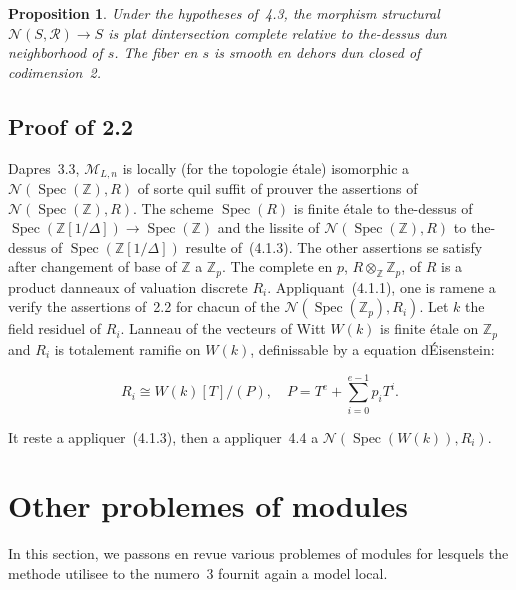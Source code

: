 \documentclass[11pt,a4paper]{article}
\theoremstyle{plain}
\newtheorem{proposition}[theorem]{Proposition}
\theoremstyle{definition}
\DeclareMathOperator{\Spec}{Spec}
\begin{document}
\begin{proposition}
Under the hypotheses of~4.3, the morphism structural
$\mathscr{N}(S, \mathscr{R}) \to S$ is plat dintersection complete relative to the-dessus dun neighborhood of
$s$. The fiber en $s$ is smooth en dehors dun closed of codimension~2.
\end{proposition}

\subsection{Proof of 2.2}

Dapres~3.3, $\mathscr{M}_{L,n}$ is locally (for the topologie étale)
isomorphic a $\mathscr{N}(\Spec(\mathbb{Z}), R)$ of sorte quil suffit of prouver the assertions of
$\mathscr{N}(\Spec(\mathbb{Z}), R)$. The scheme $\Spec(R)$ is finite étale to the-dessus of
$\Spec(\mathbb{Z}[1/\Delta]) \to \Spec(\mathbb{Z})$ and the lissite of $\mathscr{N}(\Spec(\mathbb{Z}), R)$ to the-dessus of
$\Spec(\mathbb{Z}[1/\Delta])$ resulte of~(4.1.3). The other assertions se satisfy after changement
of base of $\mathbb{Z}$ a $\mathbb{Z}_p$. The complete en $p$, $R \otimes_\mathbb{Z} \mathbb{Z}_p$, of $R$ is a product
danneaux of valuation discrete $R_i$. Appliquant~(4.1.1), one is ramene a verify
the assertions of~2.2 for chacun of the $\mathscr{N}(\Spec(\mathbb{Z}_p), R_i)$. Let $k$ the field residuel
of $R_i$. Lanneau of the vecteurs of Witt $W(k)$ is finite étale on $\mathbb{Z}_p$ and $R_i$ is
totalement ramifie on $W(k)$, definissable by a equation d\'Eisenstein:

\begin{equation}
R_i \cong W(k)[T]/(P), \quad P = T^{e} + \sum_{i=0}^{e-1} p_i T^i.
\end{equation}

It reste a appliquer~(4.1.3), then a appliquer~4.4 a $\mathscr{N}(\Spec(W(k)), R_i)$.

\section{Other problemes of modules}

In this section, we passons en revue various problemes of modules for
lesquels the methode utilisee to the numero~3 fournit again a model local.

\subsection{}
\end{document}
